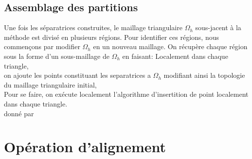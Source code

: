 \subsection{Assemblage des partitions}

Une fois les séparatrices construites, le maillage triangulaire $\Omega_h$ sous-jacent à la méthode est divisé en plusieurs régions. Pour identifier ces régions, nous commençons par modifier $\Omega_h$ en un nouveau maillage. On récupère chaque région sous la forme d'un sous-maillage de $\Omega_h$ en faisant:
Localement dans chaque triangle,\\
on ajoute les points constituant les separatrices a $\Omega_h$ modifiant ainsi la topologie du maillage triangulaire initial,\\
Pour se faire, on exécute localement l'algorithme d'insertition de point localement dans chaque triangle.\\
donné par\\

\section{Opération d'alignement}

